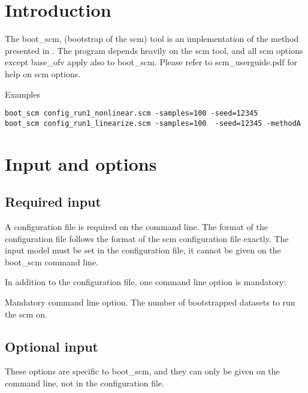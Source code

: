 

\usepackage{hyperref}



\maketitle

\newcommand{\guidetoolname}{boot\_scm}
\tableofcontents
\newpage
\section{Introduction}

The boot\_scm, (bootstrap of the scm) tool is an implementation of the method presented in \cite{Keizer2}.
The program depends heavily on the scm tool, and all scm options except base\_ofv apply also to boot\_scm. Please refer to scm\_userguide.pdf for help on scm options.

Examples
\begin{verbatim}
boot_scm config_run1_nonlinear.scm -samples=100 -seed=12345
boot_scm config_run1_linearize.scm -samples=100  -seed=12345 -methodA
\end{verbatim}

\section{Input and options}

\subsection{Required input}
A configuration file is required on the command line. The format of the configuration file follows the format of 
the scm configuration file exactly. 
The input model must be set in the configuration file, it cannot be given on the boot\_scm command line. 

In addition to the configuration file, one command line option is mandatory:
	
\begin{optionlist}
Mandatory command line option.
The number of bootstrapped datasets to run the scm on. 
\nextopt
\end{optionlist}

\subsection{Optional input}
These options are specific to boot\_scm, and they can only be given on the command line, not in the configuration file.

